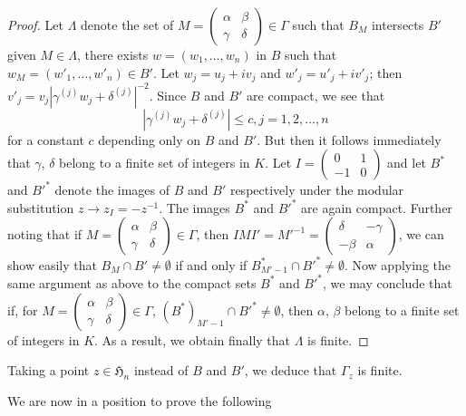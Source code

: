 \begin{proof}
Let $\Lambda$ denote the set of $M=\left(\begin{smallmatrix}\alpha &
  \beta\\ \gamma & \delta\end{smallmatrix}\right)\in\Gamma$ such that
  $B_{M}$ intersects $B'$ \ie given $M\in\Lambda$, there exists
  $w=(w_{1},\ldots,w_{n})$ in $B$ such that\pageoriginale
  $w_{M}=(w'_{1},\ldots,w'_{n})\in B'$. Let $w_{j}=u_{j}+iv_{j}$ and
  $w'_{j}=u'_{j}+iv'_{j}$; then
  $v'_{j}=v_{j}|\gamma^{(j)}w_{j}+\delta^{(j)}|^{-2}$. Since $B$ and
  $B'$ are compact, we see that
$$
|\gamma^{(j)}w_{j}+\delta^{(j)}|\leq c,j=1,2,\ldots,n
$$
for a constant $c$ depending only on $B$ and $B'$. But then it follows
immediately that $\gamma$, $\delta$ belong to a finite set of integers
in $K$. Let $I=\left(\begin{smallmatrix} 0 & 1\\ -1 & 0
\end{smallmatrix}\right)$ and let $B^{\ast}$ and ${B'}^{\ast}$ denote
the images of $B$ and $B'$ respectively under the modular substitution
$z\to z_{I}=-z^{-1}$. The images $B^{\ast}$ and ${B'}^{\ast}$ are
again compact. Further noting that if $M=\left(\begin{smallmatrix}
  \alpha & \beta\\ \gamma & \delta\end{smallmatrix}\right)\in\Gamma$,
  then $IMI'={M'}^{-1}=\left(\begin{smallmatrix} \delta &
    -\gamma\\ -\beta & \alpha   \end{smallmatrix}\right)$, we can show
  easily that $B_{M}\cap B'\neq \emptyset$ if and only if
  $B^{\ast}_{M'-1}\cap {B'}^{\ast}\neq \emptyset$. Now applying the
  same argument as above to the compact sets $B^{\ast}$ and
  ${B'}^{\ast}$, we may conclude that if, for
  $M=\left(\begin{smallmatrix} \alpha & \beta\\ \gamma & \delta
  \end{smallmatrix}\right)\in \Gamma$, $(B^{\ast})_{M'-1}\cap
  {B'}^{\ast}\neq \emptyset$, then $\alpha$, $\beta$ belong to a
  finite set of integers in $K$. As a result, we obtain finally that
  $\Lambda$ is finite.
\end{proof}

Taking a point $z\in\mathfrak{H}_{n}$ instead of $B$ and $B'$, we
deduce that $\Gamma_{z}$ is finite.

We are now in a position to prove the following

